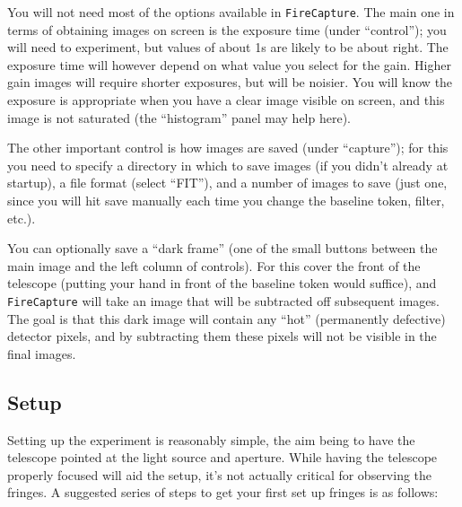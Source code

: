 \documentclass[11pt]{article}
\begin{document}
You will not need most of the options available in \texttt{FireCapture}. The main one in terms of obtaining images on screen is the exposure time (under ``control''); you will need to experiment, but values of about 1s are likely to be about right. The exposure time will however depend on what value you select for the gain. Higher gain images will require shorter exposures, but will be noisier. You will know the exposure is appropriate when you have a clear image visible on screen, and this image is not saturated (the ``histogram'' panel may help here).

The other important control is how images are saved (under ``capture''); for this you need to specify a directory in which to save images (if you didn't already at startup), a file format (select ``FIT''), and a number of images to save (just one, since you will hit save manually each time you change the baseline token, filter, etc.).

You can optionally save a ``dark frame'' (one of the small buttons between the main image and the left column of controls). For this cover the front of the telescope (putting your hand in front of the baseline token would suffice), and \texttt{FireCapture} will take an image that will be subtracted off subsequent images. The goal is that this dark image will contain any ``hot'' (permanently defective) detector pixels, and by subtracting them these pixels will not be visible in the final images.

\subsection{Setup}

Setting up the experiment is reasonably simple, the aim being to have the telescope pointed at the light source and aperture. While having the telescope properly focused will aid the setup, it's not actually critical for observing the fringes. A suggested series of steps to get your first set up fringes is as follows:
\end{document}
